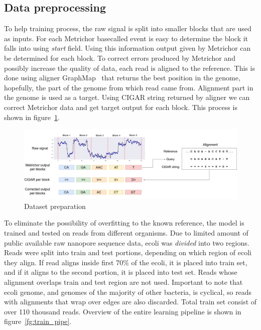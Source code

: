 \documentclass[runningheads,a4paper]{llncs}
\begin{document}
\subsection{Data preprocessing}

To help training process, the raw signal is split into smaller blocks that are used as inputs. For each Metrichor basecalled event is easy to determine the block it falls into using \textit{start} field. Using this information output given by Metrichor can be determined for each block.
To correct errors produced by Metrichor and possibly increase the quality of data, each read is aligned to the reference. This is done using aligner GraphMap~\cite{sovic2016fast} that returns the best position in the genome, hopefully, the part of the genome from which read came from.
Alignment part in the genome is used as a target. Using CIGAR string returned by aligner we can correct Metrichor data and get target output for each block. This process is shown in figure~\ref{fg:data_correction}.

\begin{figure}[!ht]
	\begin{center}
		\includegraphics[width=1\textwidth]{./imgs/train_data_correction.png}
		\caption{Dataset preparation}
		\label{fg:data_correction}
	\end{center}
\end{figure}


To eliminate the possibility of overfitting to the known reference, the model is trained and tested on reads from different organisms. Due to limited amount of public available raw nanopore sequence data, ecoli was \emph{divided} into two regions.
Reads were split into train and test portions, depending on which region of ecoli they align.
If read aligns inside first 70\% of the ecoli, it is placed into train set, and if it aligns to the second portion, it is placed into test set. Reads whose alignment overlaps train and test region are not used. Important to note that ecoli genome, and genomes of the majority of other bacteria, is cyclical, so reads with alignments that wrap over edges are also discarded. Total train set consist of over 110 thousand reads.
Overview of the entire learning pipeline is shown in figure~\ref{fg:train_pipe}.
\end{document}
